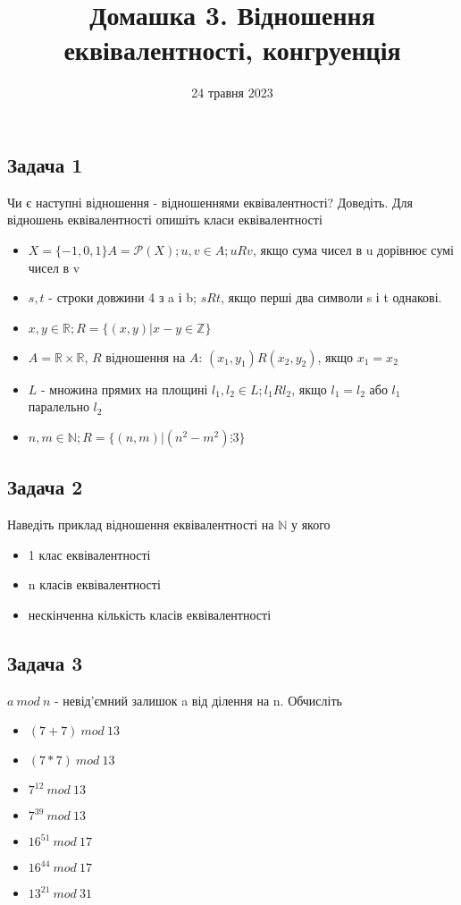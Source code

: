 \documentclass{article}
\begin{document}
\title{Домашка 3. Відношення еквівалентності, конгруенція}
\date{24 травня 2023}

\maketitle

\subsection*{Задача 1}
Чи є наступні відношення - відношеннями еквівалентності? Доведіть. Для відношень еквівалентності опишіть класи еквівалентності
\begin{itemize}
    \item $X=\{-1,0,1\} A=\mathcal{P}(X); u,v \in A; uRv$, якщо сума чисел в u дорівнює сумі чисел в v
    \item $s,t$ - строки довжини 4 з a і b; $sRt$, якщо перші два символи s і t однакові.
    \item $x,y \in \mathbb{R}; R = \{(x,y)|x-y \in \mathbb{Z} \}$
    \item $A = \mathbb{R} \times \mathbb{R}$, $R$ відношення на $A$: $(x_1,y_1)R(x_2,y_2)$, якщо $x_1 = x_2$
    \item $L$ - множина прямих на площині $l_1,l_2 \in L; l_1 R l_2$, якщо $l_1=l_2$ або $l_1$ паралельно $l_2$
    \item  $n,m \in \mathbb{N}; R = \{(n,m)|(n^2-m^2) \vdots 3\}$
\end{itemize}

\subsection*{Задача 2}
Наведіть приклад відношення еквівалентності на $\mathbb{N}$ у якого
\begin{itemize}
    \item 1 клас еквівалентності
    \item n класів еквівалентності
    \item нескінченна кількість класів еквівалентності
\end{itemize}

\subsection*{Задача 3}
$a\ mod\ n$ - невід'ємний залишок a від ділення на n. Обчисліть
\begin{itemize}
    \item $(7+7)\ mod\ 13$
    \item $(7*7)\ mod\ 13$
    \item $7^{12}\ mod\ 13$
    \item $7^{39}\ mod\ 13$
    \item $16^{51}\ mod\ 17$
    \item $16^{44}\ mod\ 17$
    \item $13^{21}\ mod\ 31$
\end{itemize}
\end{document}
